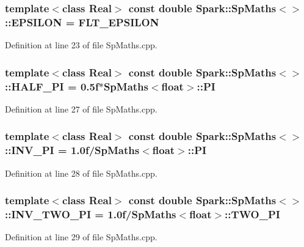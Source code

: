 \subsubsection{\setlength{\rightskip}{0pt plus 5cm}template$<$class Real$>$ const double {\bf Spark::Sp\-Maths}$<$$>$::{\bf EPSILON} = FLT\_\-EPSILON\hspace{0.3cm}{\tt  [static]}}\label{classSpark_1_1SpMaths_s7}


Definition at line 23 of file Sp\-Maths.cpp.
\subsubsection{\setlength{\rightskip}{0pt plus 5cm}template$<$class Real$>$ const double {\bf Spark::Sp\-Maths}$<$$>$::{\bf HALF\_\-PI} = 0.5f$\ast${\bf Sp\-Maths}$<$float$>$::{\bf PI}\hspace{0.3cm}{\tt  [static]}}\label{classSpark_1_1SpMaths_s2}


Definition at line 27 of file Sp\-Maths.cpp.
\subsubsection{\setlength{\rightskip}{0pt plus 5cm}template$<$class Real$>$ const double {\bf Spark::Sp\-Maths}$<$$>$::{\bf INV\_\-PI} = 1.0f/{\bf Sp\-Maths}$<$float$>$::{\bf PI}\hspace{0.3cm}{\tt  [static]}}\label{classSpark_1_1SpMaths_s3}


Definition at line 28 of file Sp\-Maths.cpp.
\subsubsection{\setlength{\rightskip}{0pt plus 5cm}template$<$class Real$>$ const double {\bf Spark::Sp\-Maths}$<$$>$::{\bf INV\_\-TWO\_\-PI} = 1.0f/{\bf Sp\-Maths}$<$float$>$::{\bf TWO\_\-PI}\hspace{0.3cm}{\tt  [static]}}\label{classSpark_1_1SpMaths_s4}


Definition at line 29 of file Sp\-Maths.cpp.
